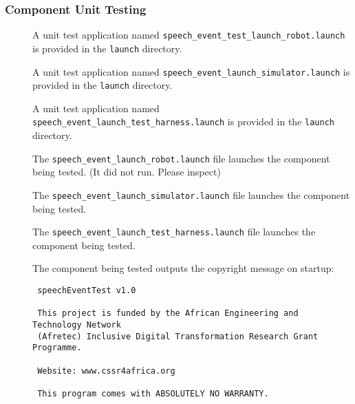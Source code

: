 \documentclass{CSSRforAfrica}
\newcommand{\checkboxChecked}{\fbox{\ding{51}}} %
\newcommand{\checkboxDashed}{\fbox{--}}         %
\begin{document}
\subsubsection{Component Unit Testing}
\label{subsubsection:speech_event_test_unit_testing}

\begin{description}

\item[\checkboxChecked] A unit test application named {\small \verb+speech_event_test_launch_robot.launch+} is provided in the {\small \verb+launch+} directory.

\item[\checkboxDashed] A unit test application named {\small \verb+speech_event_launch_simulator.launch+} is provided in the {\small \verb+launch+} directory.

\item[\checkboxChecked] A unit test application named {\small \verb+speech_event_launch_test_harness.launch+} is provided in the {\small \verb+launch+} directory.

\item[\checkboxChecked] The {\small \verb+speech_event_launch_robot.launch+} file launches the component being tested. (It did not run. Please inspect)

\item[\checkboxDashed] The {\small \verb+speech_event_launch_simulator.launch+} file launches the component being tested.

\item[\checkboxChecked] The {\small \verb+speech_event_launch_test_harness.launch+} file launches the component being tested.

\item[\checkboxChecked] The component being tested outputs the copyright message on startup:
{\small 
\begin{verbatim}
 speechEventTest v1.0
 
 This project is funded by the African Engineering and Technology Network 
 (Afretec) Inclusive Digital Transformation Research Grant Programme.
 
 Website: www.cssr4africa.org
 
 This program comes with ABSOLUTELY NO WARRANTY.
\end{verbatim}}


\end{description}
\end{document}
